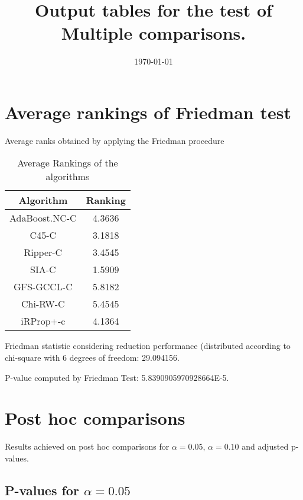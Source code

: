 \documentclass[a4paper,10pt]{article}
\title{Output tables for the test of Multiple comparisons.}
\author{}
\date{\today}
\begin{document}
\begin{landscape}
\pagestyle{empty}
\maketitle
\thispagestyle{empty}
\section{Average rankings of Friedman test}



Average ranks obtained by applying the Friedman procedure

\begin{table}[!htp]
\centering
\begin{tabular}{|c|c|}\hline
Algorithm&Ranking\\\hline
AdaBoost.NC-C & 4.3636\\
C45-C & 3.1818\\
Ripper-C & 3.4545\\
SIA-C & 1.5909\\
GFS-GCCL-C & 5.8182\\
Chi-RW-C & 5.4545\\
iRProp+-c & 4.1364\\
\hline
\end{tabular}
\caption{Average Rankings of the algorithms}
\end{table}

Friedman statistic considering reduction performance (distributed according to chi-square with 6 degrees of freedom: 29.094156.

P-value computed by Friedman Test: 5.8390905970928664E-5.\newline



\pagebreak

\section{Post hoc comparisons}

Results achieved on post hoc comparisons for $\alpha = 0.05$, $\alpha = 0.10$ and adjusted p-values.

\subsection{P-values for $\alpha=0.05$}


\end{landscape}
\end{document}
